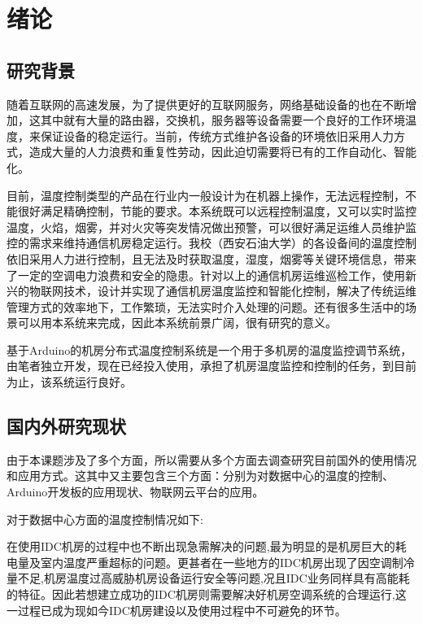 \section{绪论}

\subsection{研究背景}

随着互联网的高速发展，为了提供更好的互联网服务，网络基础设备的也在不断增加，这其中就有大量的路由器，交换机，服务器等设备需要一个良好的工作环境温度，来保证设备的稳定运行。当前，传统方式维护各设备的环境依旧采用人力方式，造成大量的人力浪费和重复性劳动，因此迫切需要将已有的工作自动化、智能化。

目前，温度控制类型的产品在行业内一般设计为在机器上操作，无法远程控制，不能很好满足精确控制，节能的要求。本系统既可以远程控制温度，又可以实时监控温度，火焰，烟雾，并对火灾等突发情况做出预警，可以很好满足运维人员维护监控的需求来维持通信机房稳定运行。我校（西安石油大学）的各设备间的温度控制依旧采用人力进行控制，且无法及时获取温度，湿度，烟雾等关键环境信息，带来了一定的空调电力浪费和安全的隐患。针对以上的通信机房运维巡检工作，使用新兴的物联网技术，设计并实现了通信机房温度监控和智能化控制，解决了传统运维管理方式的效率地下，工作繁琐，无法实时介入处理的问题。还有很多生活中的场景可以用本系统来完成，因此本系统前景广阔，很有研究的意义。

基于Arduino的机房分布式温度控制系统是一个用于多机房的温度监控调节系统，由笔者独立开发，现在已经投入使用，承担了机房温度监控和控制的任务，到目前为止，该系统运行良好。

\subsection{国内外研究现状}

由于本课题涉及了多个方面，所以需要从多个方面去调查研究目前国外的使用情况和应用方式。这其中又主要包含三个方面：分别为对数据中心的温度的控制、Arduino开发板的应用现状、物联网云平台的应用。

对于数据中心方面的温度控制情况如下:

在使用IDC机房的过程中也不断出现急需解决的问题,最为明显的是机房巨大的耗电量及室内温度严重超标的问题。更甚者在一些地方的IDC机房出现了因空调制冷量不足,机房温度过高威胁机房设备运行安全等问题,况且IDC业务同样具有高能耗的特征。因此若想建立成功的IDC机房则需要解决好机房空调系统的合理运行,这一过程已成为现如今IDC机房建设以及使用过程中不可避免的环节。

